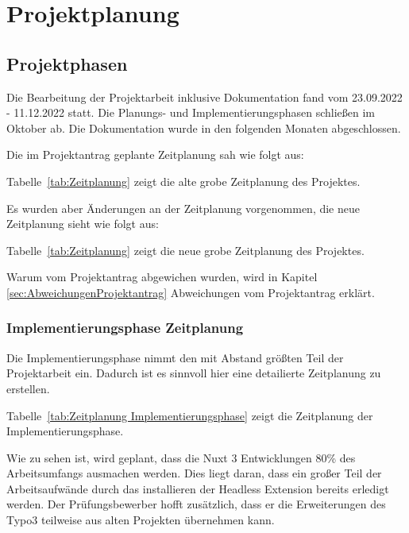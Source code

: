 \section{Projektplanung} 
\label{sec:Projektplanung}


\subsection{Projektphasen}
\label{sec:Projektphasen}

Die Bearbeitung der Projektarbeit inklusive Dokumentation fand vom 23.09.2022 - 11.12.2022 statt. Die Planungs- und Implementierungsphasen schließen im Oktober ab. Die Dokumentation wurde in den folgenden Monaten abgeschlossen.

Die im Projektantrag geplante Zeitplanung sah wie folgt aus:

Tabelle~\ref{tab:Zeitplanung} zeigt die alte grobe Zeitplanung des Projektes.


Es wurden aber Änderungen an der Zeitplanung vorgenommen, die neue Zeitplanung sieht wie folgt aus:

Tabelle~\ref{tab:Zeitplanung} zeigt die neue grobe Zeitplanung des Projektes.

Warum vom Projektantrag abgewichen wurden, wird in Kapitel \ref{sec:AbweichungenProjektantrag} Abweichungen vom Projektantrag erklärt.

\subsubsection{Implementierungsphase Zeitplanung}
\label{sec:Implementierungsphase Zeitplanung}

Die Implementierungsphase nimmt den mit Abstand größten Teil der Projektarbeit ein. Dadurch ist es sinnvoll hier eine detailierte Zeitplanung zu erstellen.

Tabelle~\ref{tab:Zeitplanung Implementierungsphase} zeigt die Zeitplanung der Implementierungsphase.

Wie zu sehen ist, wird geplant, dass die Nuxt 3 Entwicklungen 80\% des Arbeitsumfangs ausmachen werden. Dies liegt daran, dass ein großer Teil der Arbeitsaufwände durch das installieren der Headless Extension bereits erledigt werden. Der Prüfungsbewerber hofft zusätzlich, dass er die Erweiterungen des Typo3 teilweise aus alten Projekten übernehmen kann. 

